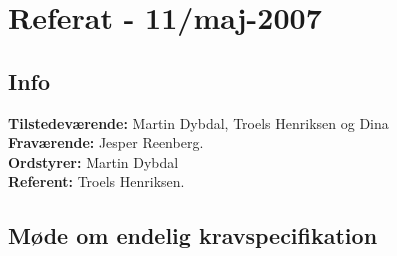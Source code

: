 \documentclass[a4paper,10pt,draft]{article}
\begin{document}
\section{Referat - 11/maj-2007}

\subsection{Info}

\textbf{Tilstedeværende:} Martin Dybdal, Troels Henriksen og Dina\\
\textbf{Fraværende:} Jesper Reenberg.\\
\textbf{Ordstyrer:} Martin Dybdal\\
\textbf{Referent:} Troels Henriksen.

\subsection{Møde om endelig kravspecifikation}
\end{document}
